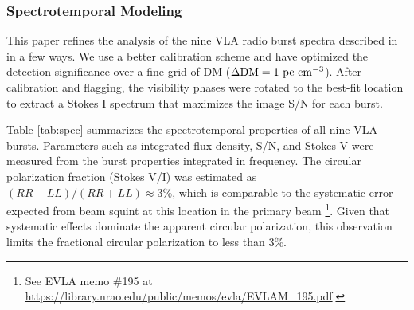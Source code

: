 \documentclass[twocolumn]{aastex61}
\begin{document}
\subsubsection{Spectrotemporal Modeling}
\label{sec:spec}

This paper refines the analysis of the nine VLA radio burst spectra described in \citet{LOC} in a few ways. We use a better calibration scheme and have optimized the detection significance over a fine grid of DM ($\Delta \rm{DM}=1\ \rm{pc}\ \rm{cm}^{-3}$). After calibration and flagging, the visibility phases were rotated to the best-fit location \citep[RA, Dec $=$ 05h31m58.70s, +33d08m52.5s;][]{LOC} to extract a Stokes I spectrum that maximizes the image S/N for each burst.

Table \ref{tab:spec} summarizes the spectrotemporal properties of all nine VLA bursts. Parameters such as integrated flux density, S/N, and Stokes V were measured from the burst properties integrated in frequency. The circular polarization fraction (Stokes V/I) was estimated as $(RR-LL)/(RR+LL)\approx3\%$, which is comparable to the systematic error expected from beam squint at this location in the primary beam \footnote{See EVLA memo \#195 at \url{https://library.nrao.edu/public/memos/evla/EVLAM_195.pdf}.}. Given that systematic effects dominate the apparent circular polarization, this observation limits the fractional circular polarization to less than 3\%.
\end{document}
